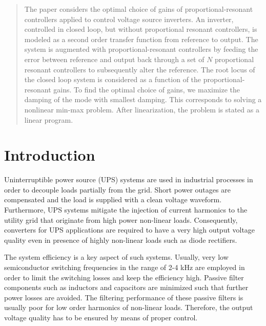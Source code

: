 \documentclass[conference,10pt]{IEEEtran}
\begin{document}
\begin{abstract}
The paper considers the optimal choice of gains of proportional-resonant controllers applied to control voltage source inverters. An inverter, controlled in closed loop, but without proportional resonant controllers, is modeled as a second order transfer function from reference to output. The system is augmented with proportional-resonant controllers by feeding the error between reference and output back through a set of $N$ proportional resonant controllers to subsequently alter the reference. The root locus of the closed loop system is considered as a function of the proportional-resonant gains. To find the optimal choice of gains, we maximize the damping of the mode with smallest damping. This corresponds to solving a nonlinear min-max problem. After linearization, the problem is stated as a linear program.
\end{abstract}





\IEEEpeerreviewmaketitle


\section{Introduction}
Uninterruptible power source (UPS) systems are used in industrial processes in order to decouple loads partially from the grid. Short power outages are compensated and the load is supplied with a clean voltage waveform. Furthermore, UPS systems mitigate the injection of current harmonics to the utility grid that originate from high power non-linear loads.  Consequently, converters for UPS applications are required to have a very high output voltage quality even in presence of highly non-linear loads such as diode rectifiers.

The system efficiency is a key aspect of such systems. Usually, very low semiconductor switching frequencies in the range of 2-4 kHz are employed in order to limit the switching losses and keep the efficiency high. Passive filter components such as inductors and capacitors are minimized such that further power losses are avoided. The filtering performance of these passive filters is usually poor for low order harmonics of non-linear loads. Therefore, the output voltage quality has to be ensured by means of proper control.
\end{document}
